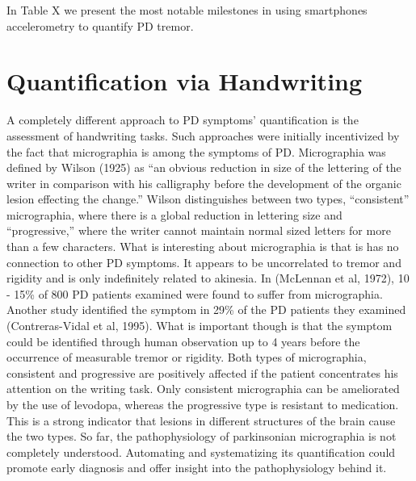 In \textcolor{BurntOrange}{Table X} we present the most notable milestones in using smartphones accelerometry to quantify \gls{PD} tremor. 


\section{Quantification via Handwriting}
\label{sec:handwriting}
A completely different approach to \gls{PD} symptoms' quantification is the assessment of handwriting tasks. Such approaches were initially incentivized by the fact that micrographia is among the symptoms of PD. Micrographia was defined by Wilson (1925) as ``an obvious reduction in size of the lettering of the writer in comparison with his calligraphy before the development of the organic lesion effecting the change.'' Wilson distinguishes between two types, ``consistent'' micrographia, where there is a global reduction in lettering size and ``progressive,'' where the writer cannot maintain normal sized letters for more than a few characters. What is interesting about micrographia is that is has no connection to other \gls{PD} symptoms. It appears to be uncorrelated to tremor and rigidity and is only indefinitely related to akinesia. In (McLennan et al, 1972), 10 - 15\% of 800 \gls{PD} patients examined were found to suffer from micrographia. Another study identified the symptom in 29\% of the \gls{PD} patients they examined (Contreras-Vidal et al, 1995). What is important though is that the symptom could be identified through human observation up to 4 years before the occurrence of measurable tremor or rigidity. 
Both types of micrographia, consistent and progressive are positively affected if the patient concentrates his attention on the writing task. Only consistent micrographia can be ameliorated by the use of levodopa, whereas the progressive type is resistant to medication. This is a strong indicator that lesions in different structures of the brain cause the two types. So far, the pathophysiology of parkinsonian micrographia is not completely understood. Automating and systematizing its quantification could promote early diagnosis and offer insight into the pathophysiology behind it.

